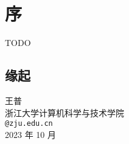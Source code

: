 \chapter*{序}
    TODO
    \section*{缘起}
     
    \begin{flushright}
        \kaishu
        王普\\
        浙江大学计算机科学与技术学院 \\
        \verb|@zju.edu.cn| \\
        2023 年 10 月
    \end{flushright}
